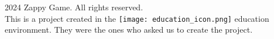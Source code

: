 \documentclass{article}
\begin{document}
\footer
    \begin{minipage}{\textwidth}
        \small \textcopyright{} 2024 Zappy Game. All rights reserved. \\
        \small This is a project created in the \texttt{[image: education\_icon.png]} education environment. They were the ones who asked us to create the project.
    \end{minipage}
\endfooter
\end{document}
